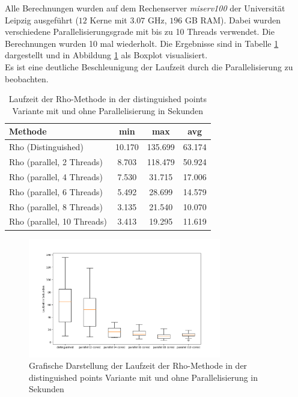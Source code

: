 \documentclass{scrartcl}
\begin{document}
Alle Berechnungen wurden auf dem Rechenserver \emph{miserv100} der Universität Leipzig ausgeführt ($12$ Kerne mit $3.07$ GHz, $196$ GB RAM).
Dabei wurden verschiedene Parallelisierungsgrade mit bis zu 10 Threads verwendet. 
Die Berechnungen wurden 10 mal wiederholt. Die Ergebnisse sind in Tabelle \ref{tab:benchmark:parallel} dargestellt und in Abbildung \ref{fig:benchmark:parallel} als Boxplot visualisiert. \\
Es ist eine deutliche Beschleunigung der Laufzeit durch die Parallelisierung zu beobachten.
\begin{table}[h]
  \centering
  \begin{tabular}{l|c|c|c}
    Methode             & min   & max   & avg   \\ \hline
    Rho (Distinguished) & 10.170 & 135.699 & 63.174 \\ \hline
    Rho (parallel, 2 Threads) & 8.703 & 118.479 & 50.924 \\ \hline
    Rho (parallel, 4 Threads) & 7.530 & 31.715 & 17.006 \\ \hline
    Rho (parallel, 6 Threads) & 5.492 & 28.699 & 14.579 \\ \hline
    Rho (parallel, 8 Threads) & 3.135 & 21.540 & 10.070 \\ \hline
    Rho (parallel, 10 Threads) & 3.413 & 19.295 & 11.619 \\ \hline
    \end{tabular}
  \caption{Laufzeit der Rho-Methode in der distinguished points Variante mit und ohne Parallelisierung in Sekunden}
  \label{tab:benchmark:parallel}
\end{table}

\begin{figure}[h]
  \centering
  \includegraphics[width=0.75\textwidth]{../projekt/benchmark/plot_miserv_parallel.png}
  \caption{Grafische Darstellung der Laufzeit der Rho-Methode in der distinguished points Variante mit und ohne Parallelisierung in Sekunden}
  \label{fig:benchmark:parallel}
\end{figure}
\end{document}
